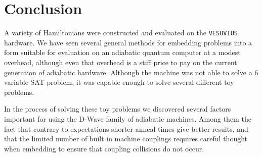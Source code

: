 \chapter{Conclusion}
A variety of Hamiltonians were constructed and evaluated on the \texttt{VESUVIUS} hardware.  We have seen several general methods for embedding problems into a form suitable for evaluation on an adiabatic quantum computer at a modest overhead, although even that overhead is a stiff price to pay on the current generation of adiabatic hardware.  Although the machine was not able to solve a 6 variable SAT problem, it was capable enough to solve several different toy problems.

In the process of solving these toy problems we discovered several factors important for using the D-Wave family of adiabatic machines.  Among them the fact that contrary to expectations shorter anneal times give better results, and that the limited number of built in machine couplings requires careful thought when embedding to ensure that coupling collisions do not occur.
